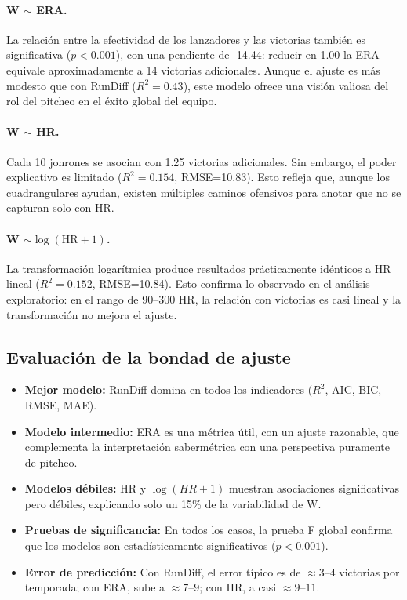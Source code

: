 \documentclass[10pt]{article}
\begin{document}
\paragraph{W \(\sim\) ERA.}  
La relación entre la efectividad de los lanzadores y las victorias también es significativa (\(p<0.001\)), con una pendiente de -14.44: reducir en 1.00 la ERA equivale aproximadamente a 14 victorias adicionales. Aunque el ajuste es más modesto que con RunDiff (\(R^2=0.43\)), este modelo ofrece una visión valiosa del rol del pitcheo en el éxito global del equipo.

\paragraph{W \(\sim\) HR.}  
Cada 10 jonrones se asocian con 1.25 victorias adicionales. Sin embargo, el poder explicativo es limitado (\(R^2=0.154\), RMSE=10.83). Esto refleja que, aunque los cuadrangulares ayudan, existen múltiples caminos ofensivos para anotar que no se capturan solo con HR.

\paragraph{W \(\sim \log(\text{HR}+1)\).}  
La transformación logarítmica produce resultados prácticamente idénticos a HR lineal (\(R^2=0.152\), RMSE=10.84). Esto confirma lo observado en el análisis exploratorio: en el rango de 90–300 HR, la relación con victorias es casi lineal y la transformación no mejora el ajuste.

\subsection{Evaluación de la bondad de ajuste}

\begin{itemize}
    \item \textbf{Mejor modelo:} RunDiff domina en todos los indicadores (\(R^2\), AIC, BIC, RMSE, MAE).
    \item \textbf{Modelo intermedio:} ERA es una métrica útil, con un ajuste razonable, que complementa la interpretación sabermétrica con una perspectiva puramente de pitcheo.
    \item \textbf{Modelos débiles:} HR y \(\log(HR+1)\) muestran asociaciones significativas pero débiles, explicando solo un 15\% de la variabilidad de W.
    \item \textbf{Pruebas de significancia:} En todos los casos, la prueba F global confirma que los modelos son estadísticamente significativos (\(p<0.001\)).
    \item \textbf{Error de predicción:} Con RunDiff, el error típico es de $\approx 3\text{--}4$ victorias por temporada; con ERA, sube a $\approx 7\text{--}9$; con HR, a casi $\approx 9\text{--}11$.
\end{itemize}
\end{document}
